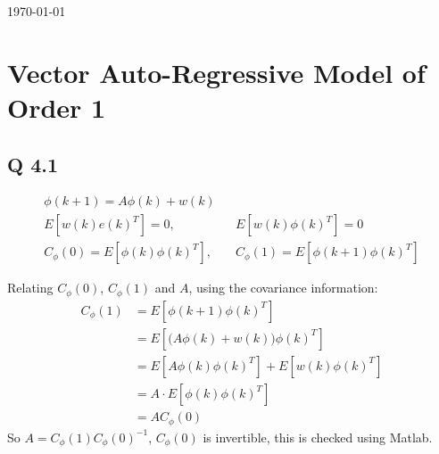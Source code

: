 \documentclass[11pt, oneside,a4paper,fleqn]{report}
\begin{document}
\begin{titlepage}
{\large \today}\\[1cm]


 

\vfill 

\end{titlepage}


\tableofcontents


\setcounter{section}{3}







\chapter{\bf Vector Auto-Regressive Model of Order 1}
\section*{Q 4.1}
\begin{align}
    \phi(k+1) = A\phi(k) + w(k)\\
    E[w(k)e(k)^T] = 0,& &E[w(k)\phi(k)^T] = 0\\
    C_\phi(0)=E[\phi(k)\phi(k)^T],& &C_\phi(1)=E[\phi(k+1)\phi(k)^T]
\end{align}

Relating $ C_\phi(0)$,  $C_\phi(1)$ and $A$, using the covariance information:
\begin{align}
    C_\phi(1)&=E[\phi(k+1)\phi(k)^T]\\
    &=E[\big(A\phi(k) + w(k)\big)\phi(k)^T]\\
    &=E[A\phi(k)\phi(k)^T] + E[w(k)\phi(k)^T]\\
    &=A \cdot E[\phi(k)\phi(k)^T]\\
    &=AC_\phi(0)
\end{align}
So $A=C_\phi(1)C_\phi(0)^{-1}$, $C_\phi(0)$ is invertible, this is checked using Matlab.
\end{document}
